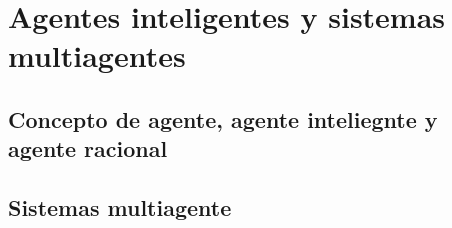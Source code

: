 \chapter{Agentes inteligentes y sistemas multiagentes}
\label{ch:sota-agents-and-mas}

\section{Concepto de agente, agente inteliegnte y agente racional}

\section{Sistemas multiagente}
\label{ch:sota-agents-and-mas:s:mas}